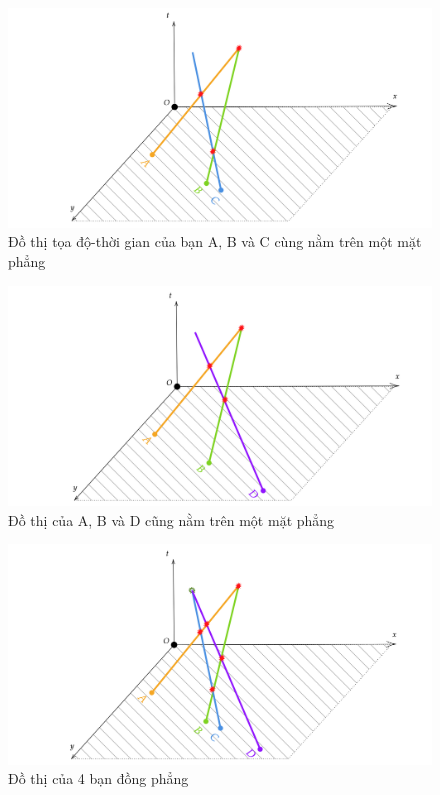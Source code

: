 \begin{enumerate}
\begin{figure}[H]
\centering
\includegraphics[scale = 0.25]{Problem_1/Image/Cach 1_B1.png}
\caption{Đồ thị tọa độ-thời gian của bạn A, B và C cùng nằm trên một mặt phẳng}
\end{figure}
\begin{figure}[H]
\centering
\includegraphics[scale = 0.25]{Problem_1/Image/Cach 1_B2.png}
\caption{Đồ thị của A, B và D cũng nằm trên một mặt phẳng}
\end{figure}
\begin{figure}[H]
\centering
\includegraphics[scale = 0.25]{Problem_1/Image/Cach 1_B3.png}
\caption{Đồ thị của 4 bạn đồng phẳng}
\end{figure}


\end{enumerate}
